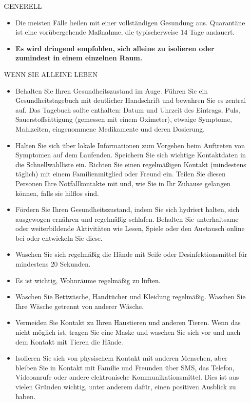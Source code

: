 \documentclass{article}
\begin{document}
\begin{center}GENERELL\end{center}
\begin{itemize}
\item Die meisten Fälle heilen mit einer vollständigen Gesundung aus. Quarantäne ist eine vorübergehende Maßnahme, die typischerweise 14 Tage andauert.
\item \textbf{Es wird dringend empfohlen, sich alleine zu isolieren oder zumindest in einem einzelnen Raum.}




\end{itemize}
\begin{center}WENN SIE ALLEINE LEBEN\end{center}
\begin{itemize}
\item Behalten Sie Ihren Gesundheitszustand im Auge. Führen Sie ein Gesundheitstagebuch mit deutlicher Handschrift und bewahren Sie es zentral auf. Das Tagebuch sollte enthalten: Datum und Uhrzeit des Eintrags, Puls, Sauerstoffsättigung (gemessen mit einem Oximeter), etwaige Symptome, Mahlzeiten, eingenommene Medikamente und deren Dosierung.
\item Halten Sie sich über lokale Informationen zum Vorgehen beim Auftreten von Symptomen auf dem Laufenden. Speichern Sie sich wichtige Kontaktdaten in die Schnellwahlliste ein. Richten Sie einen regelmäßigen Kontakt (mindestens täglich) mit einem Familienmitglied oder Freund ein. Teilen Sie diesen Personen Ihre Notfallkontakte mit und, wie Sie in Ihr Zuhause gelangen können, falls sie hilflos sind.
\item Fördern Sie Ihren Gesundheitszustand, indem Sie sich hydriert halten, sich ausgewogen ernähren und regelmäßig schlafen. Behalten Sie unterhaltsame oder weiterbildende Aktivitäten wie Lesen, Spiele oder den Austausch online bei oder entwickeln Sie diese.
\item Waschen Sie sich regelmäßig die Hände mit Seife oder Desinfektionsmittel für mindestens 20 Sekunden.
\item Es ist wichtig, Wohnräume regelmäßig zu lüften.
\item Waschen Sie Bettwäsche, Handtücher und Kleidung regelmäßig. Waschen Sie Ihre Wäsche getrennt von anderer Wäsche.
\item Vermeiden Sie Kontakt zu Ihren Haustieren und anderen Tieren. Wenn das nicht möglich ist, tragen Sie eine Maske und waschen Sie sich vor und nach dem Kontakt mit Tieren die Hände.
\item Isolieren Sie sich von physischem Kontakt mit anderen Menschen, aber bleiben Sie in Kontakt mit Familie und Freunden über SMS, das Telefon, Videoanrufe oder andere elektronische Kommunikationsmittel. Dies ist aus vielen Gründen wichtig, unter anderem dafür, einen positiven Ausblick zu haben.

\end{itemize}
\end{document}
